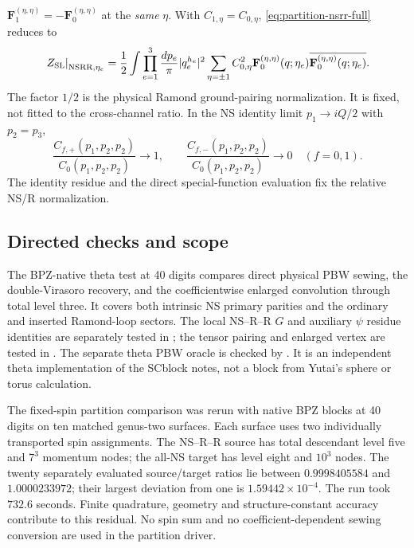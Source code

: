 $\mathbf F_1^{(\eta,\eta)}=-\mathbf F_0^{(\eta,\eta)}$ at the
\emph{same} $\eta$. With $C_{1,\eta}=C_{0,\eta}$,
\eqref{eq:partition-nsrr-full} reduces to
\begin{equation}
 \left.Z_{\mathrm{SL}}\right|_{\mathrm{NS}\mathrm R\mathrm R,\eta_e}
 =\frac12\int\prod_{e=1}^3\frac{dp_e}{\pi}|q_e^{h_e}|^2
 \sum_{\eta=\pm1}C_{0,\eta}^2
 \mathbf F_0^{(\eta,\eta)}(q;\eta_e)
 \overline{\mathbf F_0^{(\eta,\eta)}(q;\eta_e)}.
 \label{eq:partition-nsrr}
\end{equation}
The factor $1/2$ is the physical Ramond ground-pairing
normalization. It is fixed, not fitted to the cross-channel ratio.
In the NS identity limit $p_1\to iQ/2$ with $p_2=p_3$,
\begin{equation}
 \frac{C_{f,+}(p_1,p_2,p_2)}{C_0(p_1,p_2,p_2)}\to1,
 \qquad
 \frac{C_{f,-}(p_1,p_2,p_2)}{C_0(p_1,p_2,p_2)}\to0
 \quad(f=0,1).
 \label{eq:partition-identity-residue}
\end{equation}
The identity residue and the direct special-function evaluation
fix the relative NS/R normalization.

\subsection{Directed checks and scope}

The BPZ-native theta test at 40 digits compares direct physical
PBW sewing, the double-Virasoro recovery, and the coefficientwise
enlarged convolution through total level three. It covers both
intrinsic NS primary parities and the ordinary and inserted
Ramond-loop sectors. The local NS--R--R $G$ and auxiliary $\psi$
residue identities are separately tested in
; the tensor pairing
and enlarged vertex are tested in
.
The separate theta PBW oracle is checked by
. It is an independent
theta implementation of the SCblock notes, not a block from
Yutai's sphere or torus calculation.

The fixed-spin partition comparison was rerun with native BPZ
blocks at 40 digits on ten matched genus-two surfaces. Each
surface uses two individually transported spin assignments.
The NS--R--R source has total descendant level five and
$7^3$ momentum nodes; the all-NS target has level eight and
$10^3$ nodes. The twenty separately evaluated source/target
ratios lie between $0.9998405584$ and $1.0000233972$; their
largest deviation from one is $1.59442\times10^{-4}$.
The run took $732.6$ seconds. Finite quadrature, geometry and
structure-constant accuracy contribute to this residual.
No spin sum and no coefficient-dependent sewing conversion
are used in the partition driver.

